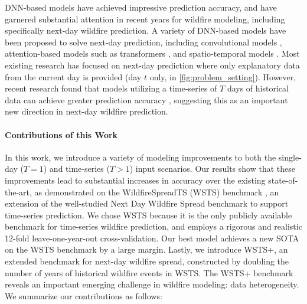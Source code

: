 DNN-based models have achieved impressive prediction accuracy, and have garnered substantial attention in recent years for wildfire modeling, including specifically next-day wildfire prediction.  A variety of DNN-based models have been proposed to solve next-day prediction, including convolutional models \cite{liu2024fire, burge2023recurrent, marjani2024cnn}, attention-based models such as transformers \cite{shah2023wildfire}, and spatio-temporal models \cite{michail2024seasonal, bolt2022spatio}.  Most existing research has focused on next-day prediction where only explanatory data from the current day is provided (day $t$ only, in \cref{fig:problem_setting}).  However, recent research found that models utilizing a time-series of $T$ days of historical data can achieve greater prediction accuracy \cite{gerard2023wildfirespreadts}, suggesting this as an important new direction in next-day wildfire prediction.  

\paragraph{Contributions of this Work} In this work, we introduce a variety of modeling improvements to both the single-day ($T=1$) and time-series ($T>1$) input scenarios. Our results show that these improvements lead to substantial increases in accuracy over the existing state-of-the-art, as demonstrated on the WildfireSpreadTS (WSTS) benchmark \cite{gerard2023wildfirespreadts}, an extension of the well-studied Next Day Wildfire Spread benchmark \cite{huot2022next} to support time-series prediction. We chose WSTS because it is the only publicly available benchmark for time-series wildfire prediction, and employs a rigorous and realistic 12-fold leave-one-year-out cross-validation.  Our best model achieves a new SOTA on the WSTS benchmark by a large margin. Lastly, we introduce WSTS+, an extended benchmark for next-day wildfire spread, constructed by doubling the number of years of historical wildfire events in WSTS. The WSTS+ benchmark reveals an important emerging challenge in wildfire modeling: data heterogeneity.  We summarize our contributions as follows: 
 
